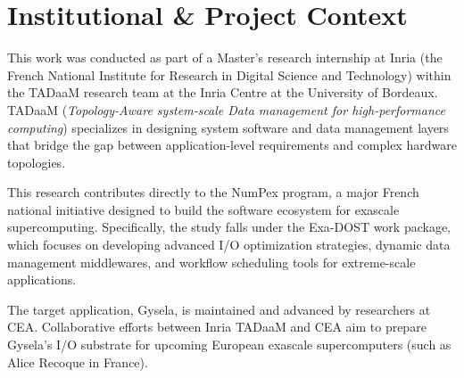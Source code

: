 \section{Institutional \& Project Context}
\label{sec:context}

This work was conducted as part of a Master's research internship at Inria (the French National 
Institute for Research in Digital Science and Technology) within the TADaaM research team at the 
Inria Centre at the University of Bordeaux. TADaaM (\textit{Topology-Aware system-scale Data management 
for high-performance computing}) specializes in designing system software and data management layers that 
bridge the gap between application-level requirements and complex hardware topologies.

This research contributes directly to the NumPex program, a major French national initiative designed to build 
the software ecosystem for exascale supercomputing. Specifically, the study falls under the Exa-DOST work package, 
which focuses on developing advanced I/O optimization strategies, dynamic data management middlewares, and workflow 
scheduling tools for extreme-scale applications.

The target application, Gysela, is maintained and advanced by researchers at CEA. Collaborative efforts between 
Inria TADaaM and CEA aim to prepare Gysela's I/O substrate for upcoming European exascale supercomputers (such as Alice Recoque in France).



